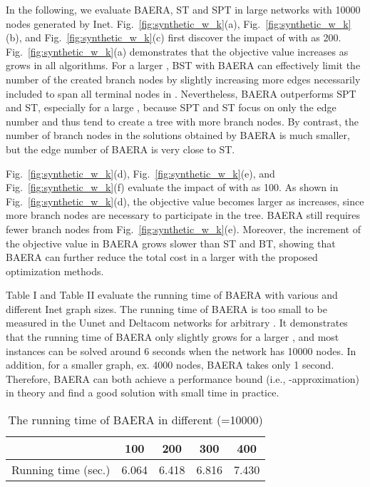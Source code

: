 \documentclass[conference]{IEEEtran}
\begin{document}
In the following, we evaluate BAERA, ST and SPT in large networks with 10000
nodes generated by Inet. Fig.~\ref{fig:synthetic_w_k}(a), Fig.~\ref {fig:synthetic_w_k}(b), and Fig.~\ref{fig:synthetic_w_k}(c) first discover
the impact of  with  as 200. Fig.~\ref{fig:synthetic_w_k}(a)
demonstrates that the objective value  increases as  grows in
all algorithms. For a larger , BST with BAERA can effectively limit the number of the created branch
nodes by slightly increasing more edges necessarily included to span all terminal nodes in . Nevertheless, BAERA outperforms
SPT and ST, especially for a large , because SPT and ST focus on only the
edge number and thus tend to create a tree with more branch nodes. By
contrast, the number of branch nodes in the solutions obtained by BAERA is
much smaller, but the edge number of BAERA is very close to ST.

Fig.~\ref{fig:synthetic_w_k}(d), Fig.~\ref{fig:synthetic_w_k}(e), and Fig.~\ref{fig:synthetic_w_k}(f) evaluate the impact of  with  as 100. As
shown in Fig.~\ref{fig:synthetic_w_k}(d), the objective value 
becomes larger as  increases, since more branch nodes are necessary to
participate in the tree. BAERA still requires fewer branch nodes from Fig.~\ref{fig:synthetic_w_k}(e). Moreover,
the increment of the objective value in BAERA grows slower than ST and BT,
showing that BAERA can further reduce the total cost in a larger  with the proposed optimization methods.

Table I and Table II evaluate the running time of BAERA with various  and
different Inet graph sizes. The running time of BAERA is too small to be
measured in the Uunet and Deltacom networks for arbitrary . It
demonstrates that the running time of BAERA only slightly grows for a larger , and most instances can be solved around 6 seconds when the network has
10000 nodes. In addition, for a smaller graph, ex. 4000 nodes, BAERA takes
only 1 second. Therefore, BAERA can both achieve a performance bound
(i.e., -approximation) in theory and find a good solution with small time
in practice.

\begin{table}[t]
\caption{The running time of BAERA in different  (=10000)}\centering
\label{table:time_k}
\begin{tabular}{|c|c|c|c|c|}
\hline
 & 100 & 200 & 300 & 400 \\ \hline
Running time (sec.) & 6.064 & 6.418 & 6.816 & 7.430 \\ \hline
\end{tabular}\end{table}
\end{document}
